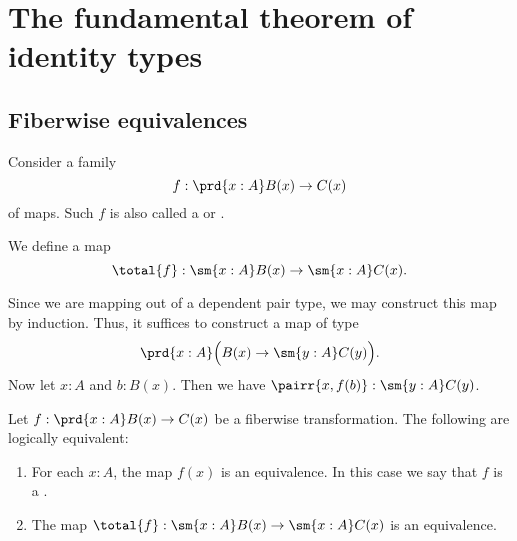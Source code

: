 \chapter{The fundamental theorem of identity types}

\section{Fiberwise equivalences}
Consider a family
\begin{equation*}
f : \prd{x:A}B(x)\to C(x)
\end{equation*}
of maps. Such $f$ is also called a  or .

\begin{defn}
We define a map
\begin{equation*}
\total{f}:\sm{x:A}B(x)\to\sm{x:A}C(x).
\end{equation*}
\end{defn}

\begin{constr}
Since we are mapping out of a dependent pair type, we may construct this map by induction. Thus, it suffices to construct a map of type
\begin{equation*}
\prd{x:A} \Big(B(x)\to \sm{y:A}C(y)\Big).
\end{equation*}
Now let $x:A$ and $b:B(x)$. Then we have $\pairr{x,f(b)}:\sm{y:A}C(y)$. 
\end{constr}

\begin{thm}\label{thm:fib_equiv}
Let $f:\prd{x:A}B(x)\to C(x)$ be a fiberwise transformation. The following are logically equivalent:
\begin{enumerate}
\item For each $x:A$, the map $f(x)$ is an equivalence. In this case we say that $f$ is a .
\item The map $\total{f}:\sm{x:A}B(x)\to\sm{x:A}C(x)$ is an equivalence.
\end{enumerate}
\end{thm}

